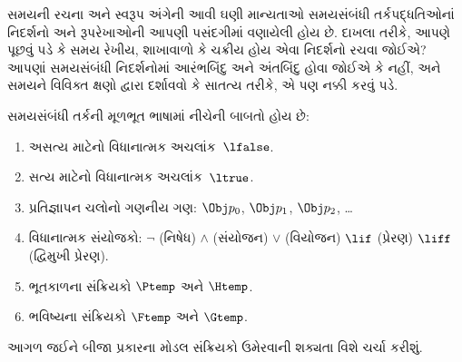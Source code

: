 સમયની રચના અને સ્વરૂપ અંગેની આવી ઘણી માન્યતાઓ સમયસંબંધી
તર્કપદ્ધતિઓનાં નિદર્શનો અને રૂપરેખાઓની આપણી પસંદગીમાં વણાયેલી હોય છે.
દાખલા તરીકે, આપણે પૂછવું પડે કે સમય રેખીય, શાખાવાળો કે ચક્રીય
હોય એવા નિદર્શનો રચવા જોઈએ? આપણાં સમયસંબંધી નિદર્શનોમાં આરંભબિંદુ અને
અંતબિંદુ હોવા જોઈએ કે નહીં, અને સમયને વિવિક્ત ક્ષણો દ્વારા
દર્શાવવો કે સાતત્ય તરીકે, એ પણ નક્કી કરવું પડે.
\endgroup

\begingroup
\makeatletter{}\makeatother


\label{guunit:OLP-0478}


\begin{defn}
સમયસંબંધી તર્કની મૂળભૂત ભાષામાં નીચેની બાબતો હોય છે:
\begin{enumerate}
  \item અસત્ય માટેનો વિધાનાત્મક અચલાંક~$\lfalse$.
  \item સત્ય માટેનો વિધાનાત્મક અચલાંક~$\ltrue$.
  \item પ્રતિજ્ઞાપન ચલોનો ગણનીય ગણ: $\Obj
    p_0$, $\Obj p_1$, $\Obj p_2$, \dots
  \item વિધાનાત્મક સંયોજકો: \startycommalist
  \ycomma $\lnot$ (નિષેધ)%
  \ycomma $\land$ (સંયોજન)%
  \ycomma $\lor$ (વિયોજન)%
  \ycomma $\lif$ (પ્રેરણ)%
  \ycomma $\liff$ (દ્વિમુખી પ્રેરણ).
  \item ભૂતકાળના સંક્રિયકો $\Ptemp$ અને $\Htemp$.
  \item ભવિષ્યના સંક્રિયકો $\Ftemp$ અને $\Gtemp$.
\end{enumerate}
\end{defn}

આગળ જઈને બીજા પ્રકારના મોડલ સંક્રિયકો ઉમેરવાની શક્યતા વિશે ચર્ચા કરીશું.

